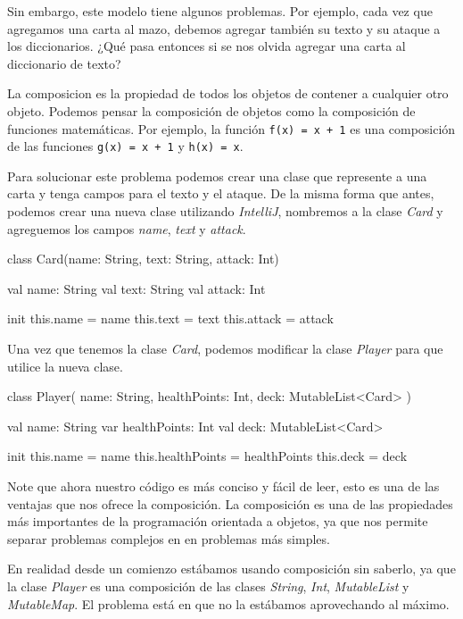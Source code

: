     Sin embargo, este modelo tiene algunos problemas.
    Por ejemplo, cada vez que agregamos una carta al mazo, debemos agregar también su texto y su
    ataque a los diccionarios.
    ¿Qué pasa entonces si se nos olvida agregar una carta al diccionario de texto?

    La composicion es la propiedad de todos los objetos de contener a cualquier otro objeto.
    Podemos pensar la composición de objetos como la composición de funciones matemáticas.
    Por ejemplo, la función \texttt{f(x) = x + 1} es una composición de las funciones
    \texttt{g(x) = x + 1} y \texttt{h(x) = x}.

    Para solucionar este problema podemos crear una clase que represente a una carta y tenga campos
    para el texto y el ataque.
    De la misma forma que antes, podemos crear una nueva clase utilizando \textit{IntelliJ}, 
    nombremos a la clase \textit{Card} y agreguemos los campos \textit{name}, \textit{text} y
    \textit{attack}.

    \begin{kotlin}
      class Card(name: String, text: String, attack: Int) {
        val name: String
        val text: String
        val attack: Int

        init {
          this.name = name
          this.text = text
          this.attack = attack
        }
      }
    \end{kotlin}

    Una vez que tenemos la clase \textit{Card}, podemos modificar la clase \textit{Player} para que
    utilice la nueva clase.

    \begin{kotlin}
      class Player(
        name: String,
        healthPoints: Int,
        deck: MutableList<Card>
      ) {
        val name: String
        var healthPoints: Int
        val deck: MutableList<Card>

        init {
          this.name = name
          this.healthPoints = healthPoints
          this.deck = deck
        }
      }
    \end{kotlin}

    Note que ahora nuestro código es más conciso y fácil de leer, esto es una de las ventajas que
    nos ofrece la composición.
    La composición es una de las propiedades más importantes de la programación orientada a objetos,
    ya que nos permite separar problemas complejos en en problemas más simples.
    
    En realidad desde un comienzo estábamos usando composición sin saberlo, ya que la clase 
    \textit{Player} es una composición de las clases \textit{String}, \textit{Int}, 
    \textit{MutableList} y \textit{MutableMap}.
    El problema está en que no la estábamos aprovechando al máximo.
    

